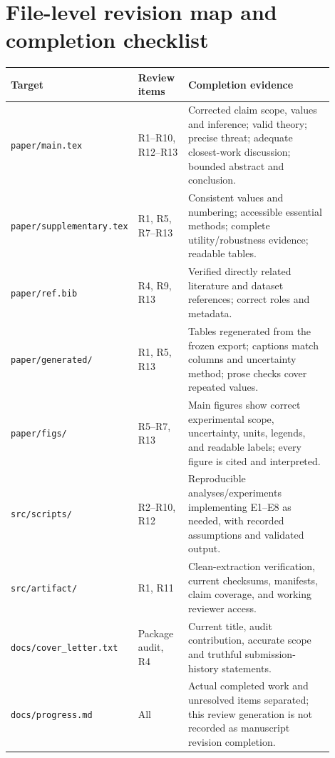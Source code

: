\documentclass[11pt,a4paper]{article}
\newcommand{\file}[1]{\nolinkurl{#1}}
\begin{document}
\section{File-level revision map and completion checklist}

\begin{longtable}{L{0.23\linewidth}L{0.16\linewidth}L{0.51\linewidth}}
\toprule
Target & Review items & Completion evidence \\
\midrule
\endhead
\file{paper/main.tex} & R1--R10, R12--R13 & Corrected claim scope, values and inference; valid theory; precise threat; adequate closest-work discussion; bounded abstract and conclusion. \\
\file{paper/supplementary.tex} & R1, R5, R7--R13 & Consistent values and numbering; accessible essential methods; complete utility/robustness evidence; readable tables. \\
\file{paper/ref.bib} & R4, R9, R13 & Verified directly related literature and dataset references; correct roles and metadata. \\
\file{paper/generated/} & R1, R5, R13 & Tables regenerated from the frozen export; captions match columns and uncertainty method; prose checks cover repeated values. \\
\file{paper/figs/} & R5--R7, R13 & Main figures show correct experimental scope, uncertainty, units, legends, and readable labels; every figure is cited and interpreted. \\
\file{src/scripts/} & R2--R10, R12 & Reproducible analyses/experiments implementing E1--E8 as needed, with recorded assumptions and validated output. \\
\file{src/artifact/} & R1, R11 & Clean-extraction verification, current checksums, manifests, claim coverage, and working reviewer access. \\
\file{docs/cover_letter.txt} & Package audit, R4 & Current title, audit contribution, accurate scope and truthful submission-history statements. \\
\file{docs/progress.md} & All & Actual completed work and unresolved items separated; this review generation is not recorded as manuscript revision completion. \\
\bottomrule
\end{longtable}
\end{document}
